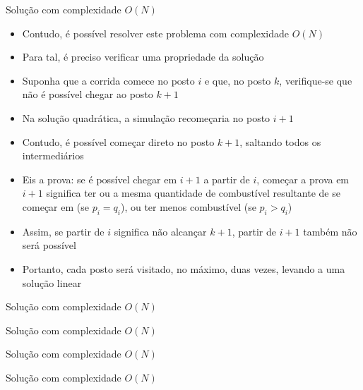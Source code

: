 \begin{frame}[fragile]{Solução com complexidade $O(N)$}

    \begin{itemize}
        \item Contudo, é possível resolver este problema com complexidade $O(N)$

        \item Para tal, é preciso verificar uma propriedade da solução 

        \item Suponha que a corrida comece no posto $i$ e que, no posto $k$, verifique-se que
            não é possível chegar ao posto $k + 1$

        \item Na solução quadrática, a simulação recomeçaria no posto $i + 1$

        \item Contudo, é possível começar direto no posto $k + 1$, saltando todos os intermediários

        \item Eis a prova: se é possível chegar em $i + 1$ a partir de $i$, começar a prova em
            $i + 1$ significa ter ou a mesma quantidade de combustível resultante de se 
            começar em (se $p_i = q_i$), ou ter menos combustível (se $p_i > q_i$)

        \item Assim, se partir de $i$ significa não alcançar $k + 1$, partir de $i + 1$ também
            não será possível

        \item Portanto, cada posto será visitado, no máximo, duas vezes, levando a uma solução
            linear
    \end{itemize}

\end{frame}

\begin{frame}[fragile]{Solução com complexidade $O(N)$}
\end{frame}

\begin{frame}[fragile]{Solução com complexidade $O(N)$}
\end{frame}

\begin{frame}[fragile]{Solução com complexidade $O(N)$}
\end{frame}

\begin{frame}[fragile]{Solução com complexidade $O(N)$}
\end{frame}

